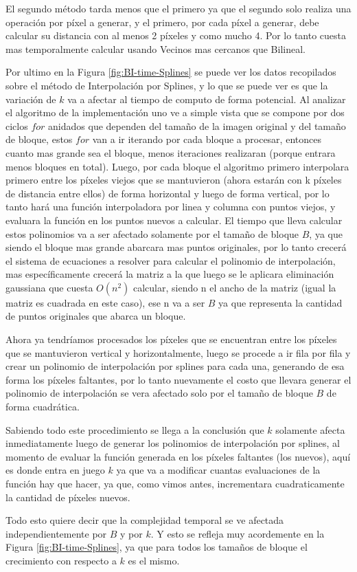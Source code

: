 \documentclass{article}
\begin{document}
El segundo método tarda menos que el primero ya que el segundo solo realiza una operación por píxel a generar, y el primero, por cada píxel a generar, debe calcular su distancia con al menos 2 píxeles y como mucho 4. Por lo tanto cuesta mas temporalmente calcular usando Vecinos mas cercanos que Bilineal. \smallbreak

Por ultimo en la Figura \ref{fig:BI-time-Splines} se puede ver los datos recopilados sobre el método de Interpolación por Splines, y lo que se puede ver es que la variación de $k$ va a afectar al tiempo de computo de forma potencial. Al analizar el algoritmo de la implementación uno ve a simple vista que se compone por dos ciclos $for$ anidados que dependen del tamaño de la imagen original y del tamaño de bloque, estos $for$ van a ir iterando por cada bloque a procesar, entonces cuanto mas grande sea el bloque, menos iteraciones realizaran (porque entrara menos bloques en total). Luego, por cada bloque el algoritmo primero interpolara primero entre los píxeles viejos que se mantuvieron (ahora estarán con k píxeles de distancia entre ellos) de forma horizontal y luego de forma vertical, por lo tanto hará una función interpoladora por linea y columna con puntos viejos, y evaluara la función en los puntos nuevos a calcular. El tiempo que lleva calcular estos polinomios va a ser afectado solamente por el tamaño de bloque $B$, ya que siendo el bloque mas grande abarcara mas puntos originales, por lo tanto crecerá el sistema de ecuaciones a resolver para calcular el polinomio de interpolación, mas específicamente crecerá la matriz a la que luego se le aplicara eliminación gaussiana que cuesta $O(n^2)$ calcular, siendo n el ancho de la matriz (igual la matriz es cuadrada en este caso), ese n va a ser $B$ ya que representa la cantidad de puntos originales que abarca un bloque.\par
Ahora ya tendríamos procesados los píxeles que se encuentran entre los píxeles que se mantuvieron vertical y horizontalmente, luego se procede a ir fila por fila y crear un polinomio de interpolación por splines para cada una, generando de esa forma los píxeles faltantes, por lo tanto nuevamente el costo que llevara generar el polinomio de interpolación se vera afectado solo por el tamaño de bloque $B$ de forma cuadrática.\par
Sabiendo todo este procedimiento se llega a la conclusión que $k$ solamente afecta inmediatamente luego de generar los polinomios de interpolación por splines, al momento de evaluar la función generada en los píxeles faltantes (los nuevos), aquí es donde entra en juego $k$ ya que va a modificar cuantas evaluaciones de la función hay que hacer, ya que, como vimos antes, incrementara cuadraticamente la cantidad de píxeles nuevos.\par
Todo esto quiere decir que la complejidad temporal se ve afectada independientemente por $B$ y por $k$. Y esto se refleja muy acordemente en la Figura \ref{fig:BI-time-Splines}, ya que para todos los tamaños de bloque el crecimiento con respecto a $k$ es el mismo.\par\smallbreak
\end{document}
